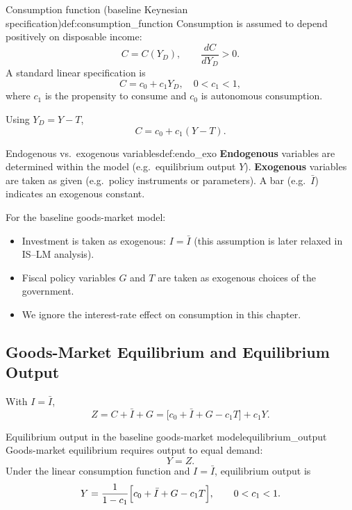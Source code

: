 \begin{definition}{Consumption function (baseline Keynesian specification)}{def:consumption_function}
Consumption is assumed to depend positively on disposable income:
\[
C = C(Y_D), \qquad \frac{dC}{dY_D} > 0.
\]
A standard linear specification is
\[
C = c_0 + c_1 Y_D,
\quad 0 < c_1 < 1,
\]
where $c_1$ is the propensity to consume and $c_0$ is autonomous consumption.
\end{definition}

\begin{keyformula}[title={Key Formula: Consumption written in terms of $Y$ and $T$}]
Using $Y_D=Y-T$,
\[
C = c_0 + c_1(Y-T).
\]
\end{keyformula}

\begin{definition}{Endogenous vs.\ exogenous variables}{def:endo_exo}
\textbf{Endogenous} variables are determined within the model (e.g.\ equilibrium output $Y$).
\textbf{Exogenous} variables are taken as given (e.g.\ policy instruments or parameters).
A bar (e.g.\ $\bar I$) indicates an exogenous constant.
\end{definition}

\noindent
For the baseline goods-market model:
\begin{itemize}
\item Investment is taken as exogenous: $I=\bar I$ (this assumption is later relaxed in IS--LM analysis).
\item Fiscal policy variables $G$ and $T$ are taken as exogenous choices of the government.
\item We ignore the interest-rate effect on consumption in this chapter.
\end{itemize}

\subsection{Goods-Market Equilibrium and Equilibrium Output}

\begin{keyformula}[title={Key Formula: Planned expenditure in a closed economy}]
With $I=\bar I$,
\[
Z = C + \bar I + G
  = \bigl[c_0 + \bar I + G - c_1T\bigr] + c_1Y.
\]
\end{keyformula}

\begin{theorem}{Equilibrium output in the baseline goods-market model}{equilibrium_output}
Goods-market equilibrium requires output to equal demand:
\[
Y = Z.
\]
Under the linear consumption function and $I=\bar I$, equilibrium output is
\[
Y
= \frac{1}{1-c_1}\Bigl[c_0 + \bar I + G - c_1T\Bigr],
\qquad 0<c_1<1.
\]
\end{theorem}

